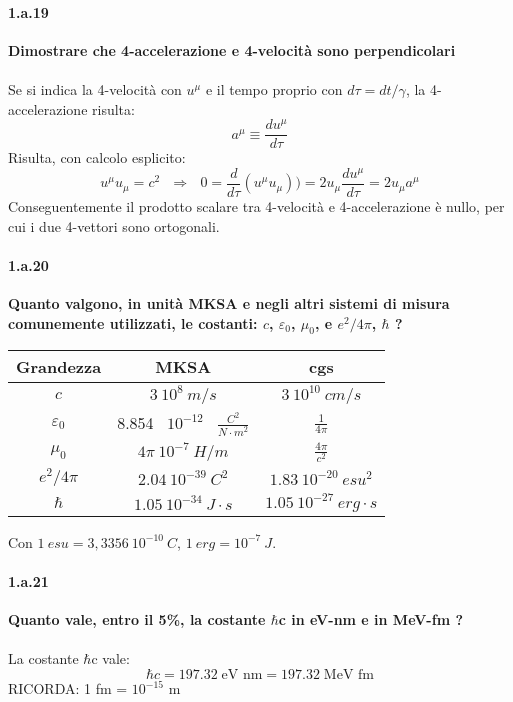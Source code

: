 \documentclass[twoside]{article}
\begin{document}
\paragraph{1.a.19} \textbf{Dimostrare che 4-accelerazione e 4-velocità sono perpendicolari
} \\ \\
Se si indica la 4-velocità con $u^{\mu}$ e il tempo proprio con $d\tau=dt/\gamma$, la 4-accelerazione risulta:
\begin{equation*}
    a^{\mu}\equiv\frac{du^{\mu}}{d\tau}
\end{equation*}
Risulta, con calcolo esplicito:
\begin{equation*}
    u^{\mu}u_{\mu}=c^2 \ \ \ \Rightarrow \ \ \ 0=\frac{d}{d\tau}( u^{\mu}u_{\mu}))=2u_{\mu}\frac{du^{\mu}}{d\tau}=2u_{\mu}a^{\mu}
\end{equation*}
Conseguentemente il prodotto scalare tra 4-velocità e 4-accelerazione è nullo, per cui i due 4-vettori sono ortogonali.
\paragraph{1.a.20} \textbf{Quanto valgono, in unità MKSA e negli altri sistemi di misura comunemente
utilizzati, le costanti: $c$, $\varepsilon_0$, $\mu_0$, e
$e^2/4\pi$, $\hbar$ ?}\\
\begin{center}
    \begin{tabular}{c|c|c}
         Grandezza & MKSA & cgs  \\
         \hline
         $c$ & $3 \ 10^8 \ m/s$ & $3 \ 10^{10} \ cm/s$\\
         $\varepsilon_0$ & 8.854 \ $10^{-12}$ \ $\frac{C^2}{N \cdot  m^2}$ & $\frac{1}{4\pi}$ \\
         $\mu_0$ & $4\pi \ 10^{-7} \ H/m$ & $\frac{4\pi}{c^2}$ \\
         $e^2/4\pi$ & $2.04 \ 10^{-39} \ C^2$ & $1.83 \ 10^{-20} \ esu^2$ \\
         $\hbar$ & $1.05 \ 10^{-34} \ J\cdot s$ & $1.05 \ 10^{-27} \ erg\cdot s$
    \end{tabular} 
\end{center}
Con $1 \ esu=3,3356 \ 10^{-10} \ C$, $1 \ erg=10^{-7} \ J$.



\paragraph{1.a.21}  \textbf{Quanto vale, entro il 5\%, la costante $\hbar$c in eV-nm e in MeV-fm ?}\\
\\
La costante $\hbar$c vale:
\[
\hbar c= 197.32 \;\text{eV nm}= 197.32 \;\text{MeV fm}
\]
RICORDA: 1 fm = $10^{-15}$ m
\end{document}
